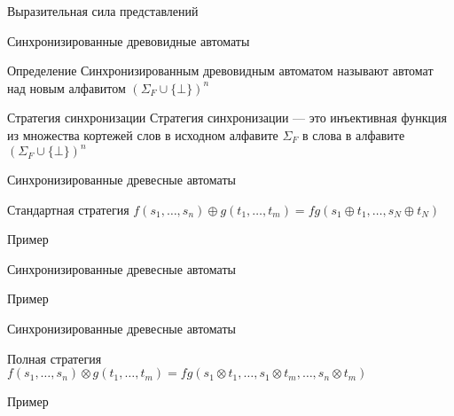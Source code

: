 \documentclass{beamer}
\begin{document}
\begin{frame}{Выразительная сила представлений}
\vspace{1em}
\invariantReprComparison
\end{frame}

\begin{frame}{Синхронизированные древовидные автоматы}
\begin{block}{Определение}
    Синхронизированным древовидным автоматом называют автомат над новым алфавитом $(\Sigma_F \cup \{\bot\})^n$
\end{block}
\begin{block}{Стратегия синхронизации}
Стратегия синхронизации --- это инъективная функция из множества кортежей слов в исходном алфавите $\Sigma_F$ в слова в алфавите $(\Sigma_F \cup \{\bot\})^n$
\end{block}
\end{frame}

\begin{frame}{Синхронизированные древесные автоматы}
\begin{block}{Стандартная стратегия}
$f(s_1, \ldots, s_n) \oplus g(t_1, \ldots, t_m) = fg(s_1 \oplus t_1, \ldots, s_N \oplus t_N)$
\end{block}
\begin{block}{Пример}
\StandartSync
\end{block}
\end{frame}

\begin{frame}{Синхронизированные древесные автоматы}

\begin{block}{Пример}
\ListLen
\end{block}

\end{frame}



\begin{frame}{Синхронизированные древесные автоматы}
\begin{block}{Полная стратегия}
$f(s_1, \ldots, s_n) \otimes g(t_1, \ldots, t_m) = fg(s_1 \otimes t_1, \ldots, s_1 \otimes t_m, \ldots, s_n \otimes t_m)$
\end{block}
\begin{block}{Пример}
\FullSync
\end{block}

\end{frame}
\end{document}
